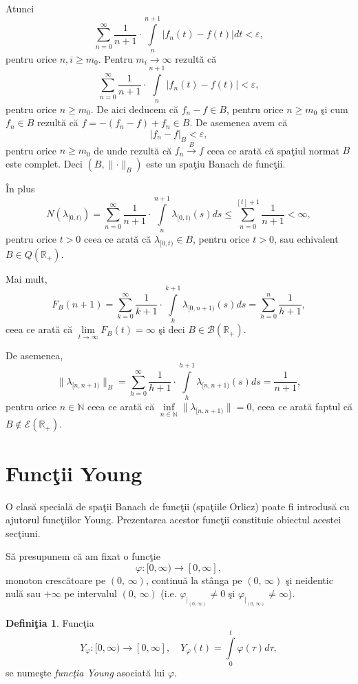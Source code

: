 \documentclass[ a4paper, 12pt]{report}
\theoremstyle{definition}
\newtheorem{definition}{\bf Defini\c tia}[section]
\theoremstyle{remark}
\numberwithin{equation}{section}
\begin{document}
Atunci
$$\sum\limits_{n=0}^{\infty}\frac{1}{n+1}\cdot \int\limits_{n}^{n+1}\lvert f_n(t)-f(t)\rvert dt < \varepsilon,$$ pentru orice $n,i\geq m_0.$
Pentru $m_i\xrightarrow{}\infty$ rezult\u a  c\u a
$$\sum\limits_{n=0}^{\infty}\frac{1}{n+1}\cdot \int\limits_{n}^{n+1}
\lvert f_n(t)-f(t) \rvert < \varepsilon,$$ pentru orice $n\geq m_0$.
De aici deducem c\u a $f_n-f \in B$, pentru orice $n\geq m_0$ \c si cum $f_n \in B$ rezult\u a c\u a $f = - (f_n - f) + f_n \in B$. De asemenea
avem c\u a
$$\lvert f_n-f\rvert_B<\varepsilon,$$ pentru orice $n\geq m_0$ de unde rezult\u a c\u a $f_n\xrightarrow{B}f$ ceea ce arat\u a c\u a spa\c tiul normat $B$ este complet. Deci $(B,\lVert \cdot \rVert_B)$ este un spa\c tiu Banach de func\c tii.

\^ In plus
$$N(\lambda_{[0,t)})=\sum\limits_{n=0}^{\infty}\frac{1}{n+1}\cdot \int\limits_{n}^{n+1}\lambda_{[0,t)}(s) ds \leq \sum\limits_{n=0}^{[t]+1}\frac{1}{n+1}<\infty,$$ pentru orice $t > 0$ ceea ce arat\u a c\u a $\lambda_{[0,t)}\in B$, pentru orice $t > 0$, sau echivalent $B\in Q(\mathbb{R}_+)$.

Mai mult,
$$F_B(n+1)=\sum\limits_{k=0}^{\infty}\frac{1}{k+1}\cdot\int\limits_{k}^{k+1}\lambda_{[0,n+1)}(s) ds = \sum\limits_{h=0}^{n}\frac{1}{h+1},$$ ceea ce arat\u a c\u a
$\lim\limits_{t \to \infty} F_B(t) = \infty$ \c si deci $B\in\mathcal{B}(\mathbb{R}_+)$.

De asemenea,
$$\lVert\lambda_{[n,n+1)}\rVert_B = \sum\limits_{h=0}^{\infty}\frac{1}{h+1}\cdot\int\limits_{h}^{h+1}\lambda_{[n,n+1)}(s) ds = \frac{1}{n+1},$$ pentru orice $n \in \mathbb{N}$ ceea ce arat\u a c\u a $\inf\limits_{n \in \mathbb{N}} \lVert \lambda_{[n,n+1)} \rVert = 0$, ceea ce arat\u a faptul c\u a $B \notin \mathcal{E}(\mathbb{R}_+)$.

\newpage


\section{Func\c tii Young}

O clas\u a special\u a de spa\c tii Banach de func\c tii (spa\c tiile Orlicz) poate fi introdus\u a cu ajutorul func\c tiilor Young. Prezentarea acestor func\c tii constituie obiectul acestei sec\c tiuni.

S\u a presupunem c\u a am fixat o func\c tie
$$\varphi : [0,\infty) \rightarrow [0,\infty],$$
monoton cresc\u atoare pe $(0, \, \infty)$, continu\u a la st\^ anga pe $(0, \, \infty)$ \c si neidentic nul\u a sau $+\infty$ pe intervalul $(0,\, \infty)$ (i.e. $\varphi_{|_{(0,\, \infty)}} \not= 0$ \c si $\varphi_{|_{(0,\, \infty)}}\not= \infty$).
\begin{definition}
Func\c tia
$$Y_\varphi : [0,\infty) \rightarrow [0,\infty], \quad Y_\varphi(t) = \int\limits_{0}^{t}\varphi(\tau) d\tau,$$
se nume\c ste \emph{func\c tia Young} asociat\u a lui $\varphi$.
\end{definition}
\end{document}
